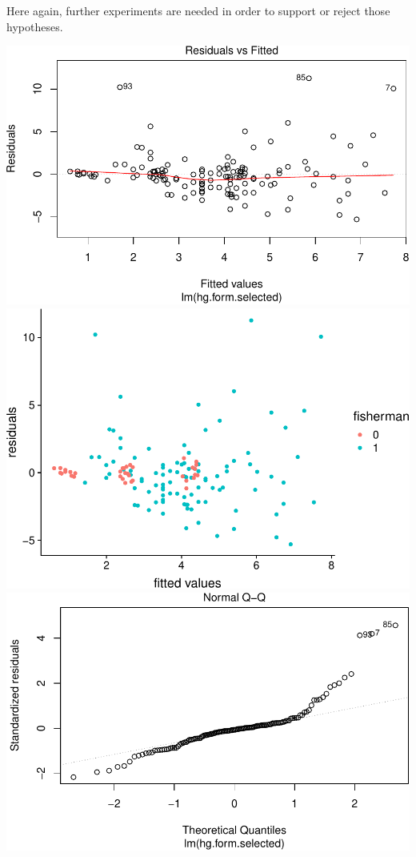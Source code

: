 \documentclass[12pt,]{article}
\begin{document}
Here again, further experiments are needed in order to support or reject
those hypotheses.

\includegraphics{Report_files/figure-latex/unnamed-chunk-16-1.pdf}
\includegraphics{Report_files/figure-latex/unnamed-chunk-16-2.pdf}
\includegraphics{Report_files/figure-latex/unnamed-chunk-16-3.pdf}
\end{document}
